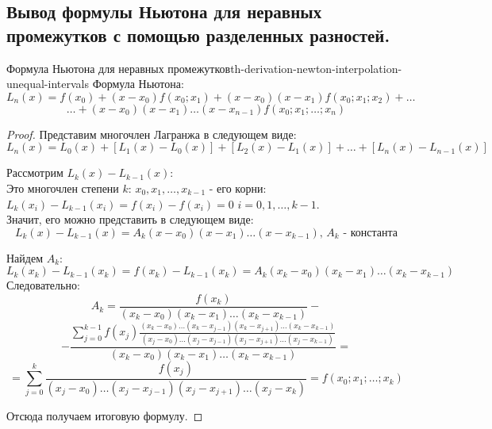 \documentclass[14pt]{extarticle}
\begin{document}
\clearpage
\subsection{Вывод формулы Ньютона для неравных промежутков с помощью разделенных разностей.}

    \begin{theorem}{Формула Ньютона для неравных промежутков}{th-derivation-newton-interpolation-unequal-intervals}
        Формула Ньютона:
        $$L_{n}(x) = f(x_{0}) + (x - x_{0})f(x_{0}; x_{1}) + (x - x_{0})(x - x_{1})f(x_{0};x_{1};x_{2}) + \ldots$$ 
        $$\ldots + (x - x_{0})(x - x_{1})\ldots(x - x_{n-1})f(x_{0}; x_{1}; \ldots; x_{n})$$

        \begin{proof}
            Представим многочлен Лагранжа в следующем виде:
            $$L_{n}(x) = L_{0}(x) + [L_{1}(x) - L_{0}(x)] + [L_{2}(x) - L_{1}(x)] + \ldots + [L_{n}(x) - L_{n - 1}(x)]$$
            
            Рассмотрим $L_{k}(x) - L_{k - 1}(x)$:\\
            Это многочлен степени $k$: $x_{0}, x_{1}, \ldots, x_{k-1}$ - его корни: $L_{k}(x_{i}) - L_{k-1}(x_{i}) = f(x_{i}) - f(x_{i}) = 0$ $i = 0, 1, \ldots, k-1$.\\
            Значит, его можно представить в следующем виде:
            $$L_{k}(x) - L_{k - 1}(x) = A_{k}(x - x_{0})(x - x_{1})\ldots(x - x_{k-1}) \text{, } A_{k} \text{ - константа}$$

            Найдем $A_{k}$:\\
            $$L_{k}(x_{k}) - L_{k - 1}(x_{k}) = f(x_{k}) - L_{k - 1}(x_{k}) = A_{k}(x_{k} - x_{0})(x_{k} - x_{1})\ldots(x_{k} - x_{k-1})$$
            Следовательно:
            $$A_{k} = \frac{f(x_{k})}{(x_{k} - x_{0})(x_{k} - x_{1})\ldots(x_{k} - x_{k-1})} - $$ 
            $$ - \frac{\sum_{j = 0}^{k - 1} f(x_{j})\frac{(x_{k} - x_{0})\ldots(x_{k} - x_{j-1})(x_{k} - x_{j+1})\ldots(x_{k} - x_{k-1})}{(x_{j} - x_{0})\ldots(x_{j} - x_{j-1})(x_{j} - x_{j+1})\ldots(x_{j} - x_{k-1})}}{(x_{k} - x_{0})(x_{k} - x_{1})\ldots(x_{k} - x_{k-1})} =$$ 
            $$= \sum_{j = 0}^{k}\frac{f(x_{j})}{(x_{j} - x_{0})\ldots(x_{j} - x_{j - 1})(x_{j} - x_{j + 1})\ldots(x_{j} - x_{k})} = f(x_{0}; x_{1}; \ldots; x_{k})$$
        
            Отсюда получаем итоговую формулу.
        \end{proof}
    \end{theorem}


\clearpage
\end{document}
